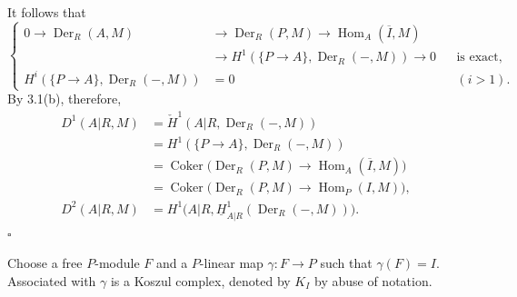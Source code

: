 
It follows that
\[
\left\{
\begin{aligned}
0\longrightarrow\operatorname{Der}_R(A,M)
&\longrightarrow\operatorname{Der}_R(P,M)
\longrightarrow\operatorname{Hom}_A(\overline I,M)\\
&\longrightarrow
H^1(\{P\longrightarrow A\},\operatorname{Der}_R(-,M))
\longrightarrow0
&&\text{is exact},\\
H^i(\{P\longrightarrow A\},\operatorname{Der}_R(-,M))
&=0 &&(i>1).
\end{aligned}
\right.
\]
By 3.1(b), therefore,
\begin{align*}
D^1(A|R,M)
 &=\check H^1(A|R,\operatorname{Der}_R(-,M))\\
 &=H^1(\{P\longrightarrow A\},\operatorname{Der}_R(-,M))\\
 &=\operatorname{Coker}\bigl(
   \operatorname{Der}_R(P,M)\longrightarrow
   \operatorname{Hom}_A(\overline I,M)\bigr)\\
 &=\operatorname{Coker}\bigl(
   \operatorname{Der}_R(P,M)\longrightarrow
   \operatorname{Hom}_P(I,M)\bigr),\\
D^2(A|R,M)
 &=H^1\bigl(A|R,
   \underline H^1_{A|R}(\operatorname{Der}_R(-,M))\bigr).
\end{align*}
\hfill$\square$

Choose a free $P$-module $F$ and a $P$-linear map
$\gamma:F\longrightarrow P$ such that $\gamma(F)=I$. Associated
with $\gamma$ is a Koszul complex, denoted by $K_I$ by abuse of
notation.
